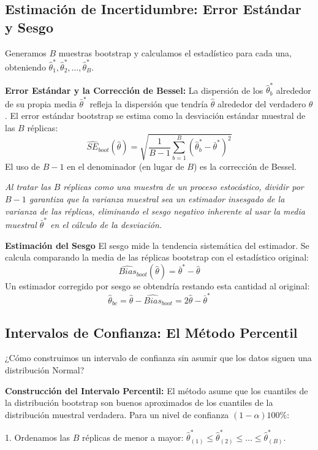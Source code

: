 \documentclass[a4paper]{article}
\begin{document}
\subsection{Estimación de Incertidumbre: Error Estándar y Sesgo}

Generamos $B$ muestras bootstrap y calculamos el estadístico para cada una, obteniendo $\hat{\theta}^*_1, \hat{\theta}^*_2, \dots, \hat{\theta}^*_B$.

\textbf{Error Estándar y la Corrección de Bessel:}
La dispersión de los $\hat{\theta}^*_b$ alrededor de su propia media $\bar{\theta}^*$ refleja la dispersión que tendría $\hat{\theta}$ alrededor del verdadero $\theta$. El error estándar bootstrap se estima como la desviación estándar muestral de las $B$ réplicas:
$$ \widehat{SE}_{boot}(\hat{\theta}) = \sqrt{\frac{1}{B-1} \sum_{b=1}^B (\hat{\theta}^*_b - \bar{\theta}^*)^2} $$
El uso de $B-1$ en el denominador (en lugar de $B$) es la corrección de Bessel. 

\textit{Al tratar las $B$ réplicas como una muestra de un proceso estocástico, dividir por $B-1$ garantiza que la varianza muestral sea un estimador insesgado de la varianza de las réplicas, eliminando el sesgo negativo inherente al usar la media muestral $\bar{\theta}^*$ en el cálculo de la desviación.}

\textbf{Estimación del Sesgo}
El sesgo mide la tendencia sistemática del estimador. Se calcula comparando la media de las réplicas bootstrap con el estadístico original:
$$ \widehat{Bias}_{boot}(\hat{\theta}) = \bar{\theta}^* - \hat{\theta} $$
Un estimador corregido por sesgo se obtendría restando esta cantidad al original:
$$ \hat{\theta}_{bc} = \hat{\theta} - \widehat{Bias}_{boot} = 2\hat{\theta} - \bar{\theta}^* $$

\subsection{Intervalos de Confianza: El Método Percentil}

¿Cómo construimos un intervalo de confianza sin asumir que los datos siguen una distribución Normal?

\textbf{Construcción del Intervalo Percentil:}
El método asume que los cuantiles de la distribución bootstrap son buenos aproximados de los cuantiles de la distribución muestral verdadera. Para un nivel de confianza $(1-\alpha)100\%$:

1. Ordenamos las $B$ réplicas de menor a mayor: $\hat{\theta}^*_{(1)} \le \hat{\theta}^*_{(2)} \le \dots \le \hat{\theta}^*_{(B)}$.
\end{document}
